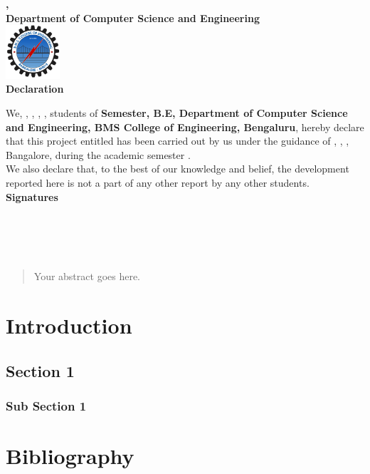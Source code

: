 \documentclass[a4paper,12pt]{report}
\begin{document}
\newpage
\begin{titlepage}
    \centering
    \textbf{\large \collegename,} \\
    \textbf{Department of Computer Science and Engineering} \\[1cm]

    \includegraphics[width=2cm]{../assets/college_logo.png} \\[1cm]

    \textbf{\LARGE Declaration} \\[1cm]
    \raggedright

    We, \textbf{\one}, \textbf{\two}, \textbf{\three}, \textbf{\four}, students of \textbf{{\semester} Semester, B.E, Department of Computer Science and Engineering, BMS College of Engineering, Bengaluru}, 
    hereby declare that this {\course } project entitled \textbf{\projectname } has been carried out by us under the guidance of \textbf{\guidename}, {\guidedesignation}, {\guidedept}, Bangalore, during the academic semester \textbf{\academicsemester}. \\[0.5cm]

    We also declare that, to the best of our knowledge and belief, the development reported here is not a part of any other report by any other students. \\[1cm]

    \hfill \textbf{Signatures} \\[1cm]

    \textbf{\one } \\ [1cm]
    \textbf{\two } \\ [1cm]
    \textbf{\three } \\ [1cm]
    \textbf{\four } \\ [1cm]
\end{titlepage}


\begin{abstract}
Your abstract goes here.
\end{abstract}
\newpage
\tableofcontents
\listoffigures
\listoftables

\chapter{Introduction}

\section{Section 1}
\subsection{Sub Section 1}

\chapter{Bibliography}
\end{document}
